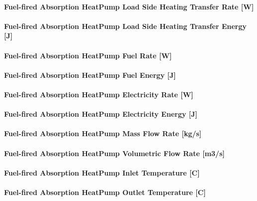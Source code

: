 \paragraph{Fuel-fired Absorption HeatPump Load Side Heating Transfer Rate [W]}

\paragraph{Fuel-fired Absorption HeatPump Load Side Heating Transfer Energy [J]}

\paragraph{Fuel-fired Absorption HeatPump Fuel Rate [W]}

\paragraph{Fuel-fired Absorption HeatPump Fuel Energy [J]}

\paragraph{Fuel-fired Absorption HeatPump Electricity Rate [W]}

\paragraph{Fuel-fired Absorption HeatPump Electricity Energy [J]}

\paragraph{Fuel-fired Absorption HeatPump Mass Flow Rate [kg/s]}

\paragraph{Fuel-fired Absorption HeatPump Volumetric Flow Rate [m3/s]}

\paragraph{Fuel-fired Absorption HeatPump Inlet Temperature [C]}

\paragraph{Fuel-fired Absorption HeatPump Outlet Temperature [C]}

